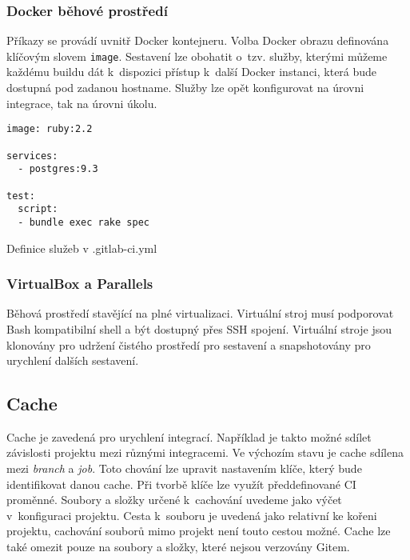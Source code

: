 \subsubsection{Docker běhové prostředí}

Příkazy se provádí uvnitř Docker kontejneru.
Volba Docker obrazu definována klíčovým slovem \verb|image|.
Sestavení lze obohatit o~tzv. služby, kterými můžeme každému buildu dát k~dispozici přístup k~další Docker instanci, která bude dostupná pod zadanou hostname.
Služby lze opět konfigurovat na úrovni integrace, tak na úrovni úkolu.

\begin{listing}[ht]
\begin{verbatim}
image: ruby:2.2

services:
  - postgres:9.3

test:
  script:
  - bundle exec rake spec
\end{verbatim}
\caption{Definice služeb v .gitlab-ci.yml}
\end{listing}

\subsubsection{VirtualBox a Parallels}

Běhová prostředí stavějící na plné virtualizaci.
Virtuální stroj musí podporovat Bash kompatibilní shell a být dostupný přes SSH spojení.
Virtuální stroje jsou klonovány pro udržení čistého prostředí pro sestavení a snapshotovány pro urychlení dalších sestavení.


\subsection{Cache}

Cache je zavedená pro urychlení integrací.
Například je takto možné sdílet závislosti projektu mezi různými integracemi.
Ve výchozím stavu je cache sdílena mezi \textit{branch} a \textit{job}.
Toto chování lze upravit nastavením klíče, který bude identifikovat danou cache.
Při tvorbě klíče lze využít předdefinované CI proměnné. 
Soubory a složky určené k~cachování uvedeme jako výčet v~konfiguraci projektu.
Cesta k~souboru je uvedená jako relativní ke kořeni projektu, cachování souborů mimo projekt není touto cestou možné. 
Cache lze také omezit pouze na soubory a složky, které nejsou verzovány Gitem.

